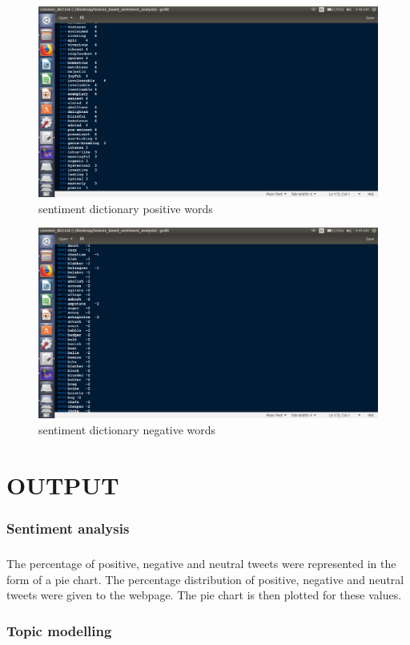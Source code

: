 \begin{figure}[!ht]
	\centering
	\includegraphics[width=0.8\linewidth]{common_dict1.png}
	\caption{sentiment dictionary positive words}
	\label{types}
\end{figure}
\begin{figure}[!ht]
	\centering
	\includegraphics[width=0.8\linewidth]{common_dict2.png}
	\caption{sentiment dictionary negative words}
	\label{types}
\end{figure}


\renewcommand\chaptername{CHAPTER}
\chapter{OUTPUT}
\subsection{Sentiment analysis}
\paragraph{} The percentage of positive, negative and neutral tweets were represented in the form of a pie chart. The percentage distribution of positive, negative and neutral tweets were given to the webpage. The pie chart is then plotted for these values.
\\
\subsection{Topic modelling}
